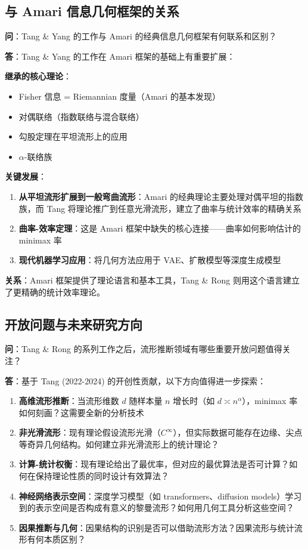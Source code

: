 \subsection{与 Amari 信息几何框架的关系}\label{sec:qa-amari-framework}

\textbf{问}：Tang \& Yang 的工作与 Amari 的经典信息几何框架有何联系和区别？

\textbf{答}：Tang \& Yang 的工作在 Amari 框架的基础上有重要扩展：

\textbf{继承的核心理论}：
\begin{itemize}
    \item Fisher 信息 = Riemannian 度量（Amari 的基本发现）
    \item 对偶联络（指数联络与混合联络）
    \item 勾股定理在平坦流形上的应用
    \item $\alpha$-联络族
\end{itemize}

\textbf{关键发展}：
\begin{enumerate}
    \item \textbf{从平坦流形扩展到一般弯曲流形}：Amari 的经典理论主要处理对偶平坦的指数族，而 Tang 将理论推广到任意光滑流形，建立了曲率与统计效率的精确关系
    \item \textbf{曲率-效率定理}：这是 Amari 框架中缺失的核心连接——曲率如何影响估计的 minimax 率
    \item \textbf{现代机器学习应用}：将几何方法应用于 VAE、扩散模型等深度生成模型
\end{enumerate}

\textbf{关系}：Amari 框架提供了理论语言和基本工具，Tang \& Rong 则用这个语言建立了更精确的统计效率理论。

\subsection{开放问题与未来研究方向}\label{sec:qa-open-problems}

\textbf{问}：Tang \& Rong 的系列工作之后，流形推断领域有哪些重要开放问题值得关注？

\textbf{答}：基于 Tang (2022-2024) 的开创性贡献，以下方向值得进一步探索：

\begin{enumerate}
    \item \textbf{高维流形推断}：当流形维数 $d$ 随样本量 $n$ 增长时（如 $d \asymp n^\alpha$），minimax 率如何刻画？这需要全新的分析技术
    \item \textbf{非光滑流形}：现有理论假设流形光滑（$C^\infty$），但实际数据可能存在边缘、尖点等奇异几何结构。如何建立非光滑流形上的统计理论？
    \item \textbf{计算-统计权衡}：现有理论给出了最优率，但对应的最优算法是否可计算？如何在保持理论性质的同时设计有效算法？
    \item \textbf{神经网络表示空间}：深度学习模型（如 transformers、diffusion models）学习到的表示空间是否构成有意义的黎曼流形？如何用几何工具分析这些空间？
    \item \textbf{因果推断与几何}：因果结构的识别是否可以借助流形方法？因果流形与统计流形有何本质区别？
\end{enumerate}

